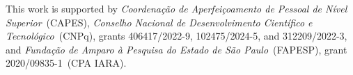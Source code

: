 \documentclass[sigconf,natbib=false]{acmart}
\begin{document}
\begin{acks}
This work is supported by \textit{Coordenação de Aperfeiçoamento de Pessoal de Nível Superior}~(CAPES), \textit{Conselho Nacional de Desenvolvimento Científico e Tecnológico}~(CNPq), grants 406417/2022-9, 102475/2024-5, and 312209/2022-3, and \textit{Fundação de Amparo à Pesquisa do Estado de São Paulo}~(FAPESP), grant 2020/09835-1~(CPA IARA). 
\end{acks}


\printbibliography
\end{document}
